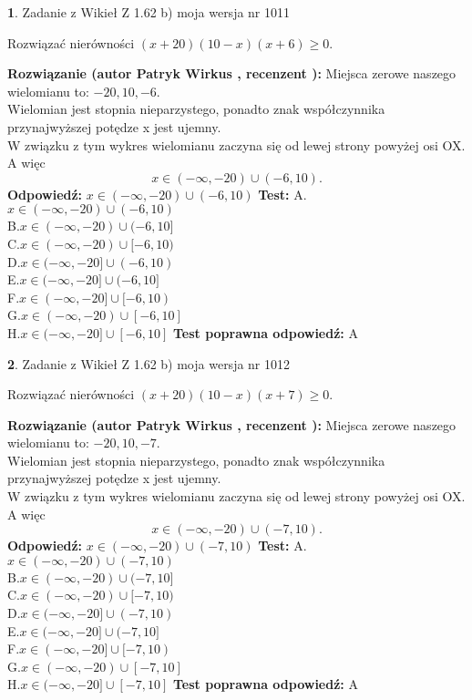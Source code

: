 \documentclass[12pt, a4paper]{article}
\theoremstyle{definition} %
\newtheorem{zad}{}
\newcommand{\zadStart}[1]{\begin{zad}#1\newline}
\newcommand{\zadStop}{\end{zad}}
\newcommand{\rozwStart}[2]{\noindent \textbf{Rozwiązanie (autor #1 , recenzent #2): }\newline}
\newcommand{\rozwStop}{\newline}
\newcommand{\odpStart}{\noindent \textbf{Odpowiedź:}\newline}
\newcommand{\odpStop}{\newline}
\newcommand{\testStart}{\noindent \textbf{Test:}\newline}
\newcommand{\testStop}{\newline}
\newcommand{\kluczStart}{\noindent \textbf{Test poprawna odpowiedź:}\newline}
\newcommand{\kluczStop}{\newline}
\begin{document}
\zadStart{Zadanie z Wikieł Z 1.62 b) moja wersja nr 1011}

Rozwiązać nierówności $(x+20)(10-x)(x+6)\ge0$.
\zadStop
\rozwStart{Patryk Wirkus}{}
Miejsca zerowe naszego wielomianu to: $-20, 10, -6$.\\
Wielomian jest stopnia nieparzystego, ponadto znak współczynnika przy\linebreak najwyższej potędze x jest ujemny.\\ W związku z tym wykres wielomianu zaczyna się od lewej strony powyżej osi OX. A więc $$x \in (-\infty,-20) \cup (-6,10).$$
\rozwStop
\odpStart
$x \in (-\infty,-20) \cup (-6,10)$
\odpStop
\testStart
A.$x \in (-\infty,-20) \cup (-6,10)$\\
B.$x \in (-\infty,-20) \cup (-6,10]$\\
C.$x \in (-\infty,-20) \cup [-6,10)$\\
D.$x \in (-\infty,-20] \cup (-6,10)$\\
E.$x \in (-\infty,-20] \cup (-6,10]$\\
F.$x \in (-\infty,-20] \cup [-6,10)$\\
G.$x \in (-\infty,-20) \cup [-6,10]$\\
H.$x \in (-\infty,-20] \cup [-6,10]$
\testStop
\kluczStart
A
\kluczStop



\zadStart{Zadanie z Wikieł Z 1.62 b) moja wersja nr 1012}

Rozwiązać nierówności $(x+20)(10-x)(x+7)\ge0$.
\zadStop
\rozwStart{Patryk Wirkus}{}
Miejsca zerowe naszego wielomianu to: $-20, 10, -7$.\\
Wielomian jest stopnia nieparzystego, ponadto znak współczynnika przy\linebreak najwyższej potędze x jest ujemny.\\ W związku z tym wykres wielomianu zaczyna się od lewej strony powyżej osi OX. A więc $$x \in (-\infty,-20) \cup (-7,10).$$
\rozwStop
\odpStart
$x \in (-\infty,-20) \cup (-7,10)$
\odpStop
\testStart
A.$x \in (-\infty,-20) \cup (-7,10)$\\
B.$x \in (-\infty,-20) \cup (-7,10]$\\
C.$x \in (-\infty,-20) \cup [-7,10)$\\
D.$x \in (-\infty,-20] \cup (-7,10)$\\
E.$x \in (-\infty,-20] \cup (-7,10]$\\
F.$x \in (-\infty,-20] \cup [-7,10)$\\
G.$x \in (-\infty,-20) \cup [-7,10]$\\
H.$x \in (-\infty,-20] \cup [-7,10]$
\testStop
\kluczStart
A
\kluczStop
\end{document}
